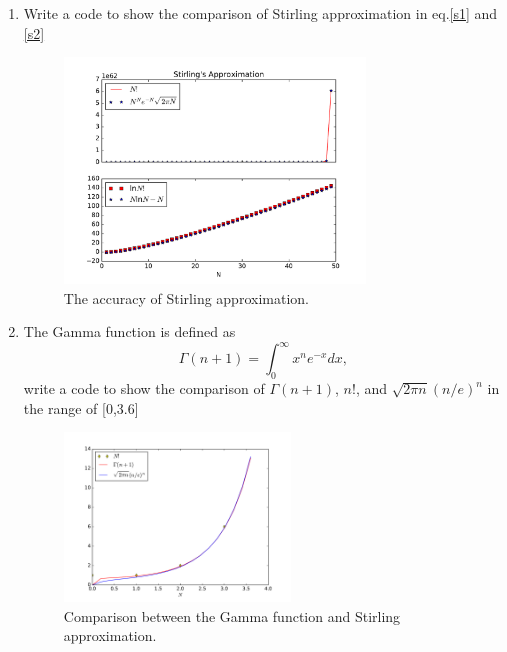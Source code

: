 \begin{enumerate}
\item Write a code to show the comparison of Stirling approximation in eq.\ref{s1} and \ref{s2}
\begin{figure}[h]
\centering
\includegraphics[width=8cm]{imgs/Stirling.pdf}
\caption{The accuracy of Stirling approximation. }
\end{figure}

\item The Gamma function is defined as 
\begin{equation} \Gamma(n+1) = \int ^\infty _0 x^n e^{-x} dx, \end{equation}
write a code to show the comparison of $\Gamma(n+1)$, $n$!, and $\sqrt{2\pi n}(n/e)^n$ in the range of [0,3.6]
\begin{figure}[h]
\centering
\includegraphics[width=6cm]{imgs/Stirling2.pdf}
\caption{Comparison between the Gamma function and Stirling approximation. }
\end{figure}


\end{enumerate}
